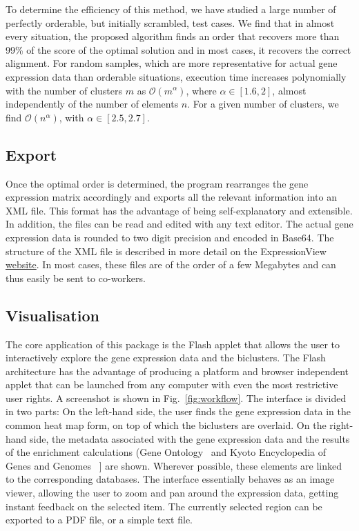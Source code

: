 \documentclass[round]{bioinfo}
\begin{document}
To determine the efficiency of this method, we have studied a large
number of perfectly orderable, but initially scrambled, test cases. We
find that in almost every situation, the proposed algorithm finds an
order that recovers more than 99\% of the score of the optimal
solution and in most cases, it recovers the correct
alignment. For random samples, which are more representative for
actual gene expression data than orderable situations, execution time
increases polynomially with the number of clusters $m$ as ${\mathcal
  O}(m^\alpha)$, where $\alpha \in [1.6, 2]$, almost independently of
the number of elements $n$. For a given number of clusters, we find
${\mathcal O}(n^\alpha)$, with $\alpha \in [2.5, 2.7]$. 

\subsection{Export}
Once the optimal order is determined, the program rearranges the gene
expression matrix accordingly and exports all the relevant information
into an XML file. This format has the advantage of being
self-explanatory and extensible. In addition, the files can be read
and edited with any text editor. The actual gene expression data is
rounded to two digit precision and encoded in Base64. The structure of
the XML file is described in more detail on the ExpressionView
\href{http://www.unil.ch/cbg/ExpressionView}{website}. In most cases,
these files are of the order of a few Megabytes and can thus easily be
sent to co-workers.  

\subsection{Visualisation}
The core application of this package is the Flash applet that allows
the user to interactively explore the gene expression data and the
biclusters. The Flash architecture has the advantage of producing a
platform and browser independent applet that can be launched from any
computer with even the most restrictive user rights. A screenshot is
shown in Fig.~\ref{fig:workflow}. The interface is divided in two
parts: On the left-hand side, the user finds the gene expression data
in the common heat map form, on top of which the biclusters are
overlaid. On the right-hand side, the metadata associated with the
gene expression data and the results of the enrichment calculations
(Gene Ontology~\citep{ashburner00} and Kyoto Encyclopedia
of Genes and Genomes ~\citep{kanehisa04}] are shown. Wherever
possible, these elements are linked to the corresponding
databases. The interface essentially behaves as an image viewer,
allowing the user to zoom and pan around the expression data, getting
instant feedback on the selected item. The currently selected region
can be exported to a PDF file, or a simple text file.
\end{document}
